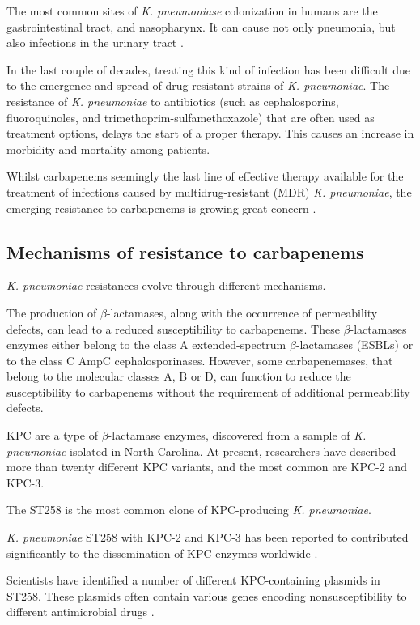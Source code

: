 \documentclass[11pt]{report}
\begin{document}
The most common sites of \emph{K. pneumoniase} colonization in humans are the gastrointestinal tract, and nasopharynx.
It can cause not only pneumonia, but also infections in the urinary tract \cite{Pitout2015, podschun1998klebsiella}.

In the last couple of decades, treating this kind of infection has been difficult due to the emergence and spread of drug-resistant strains of \emph{K. pneumoniae}.
The resistance of \emph{K. pneumoniae} to antibiotics (such as cephalosporins, fluoroquinoles, and trimethoprim-sulfamethoxazole) that are often used as treatment options, delays the start of a proper therapy.
This causes an increase in morbidity and mortality among patients.

Whilst carbapenems seemingly the last line of effective therapy available for the treatment of infections caused by multidrug-resistant (MDR) \emph{K. pneumoniae}, the emerging resistance to carbapenems is growing great concern
 \cite{Pitout2015}.

\subsection{Mechanisms of resistance to carbapenems} 

\emph{K. pneumoniae} resistances evolve through different mechanisms.

The production of $\beta$-lactamases, along with the occurrence of permeability defects, can lead to a reduced susceptibility to carbapenems.
These $\beta$-lactamases enzymes either belong to the class A extended-spectrum $\beta$-lactamases (ESBLs) or to the class C AmpC cephalosporinases.
However, some carbapenemases, that belong to the molecular classes A, B or D, can function to reduce the susceptibility to carbapenems without the requirement of additional permeability defects.

KPC are a type of $\beta$-lactamase enzymes, discovered from a sample of \emph{K. pneumoniae} isolated in North Carolina. At present, researchers have described more than twenty different KPC variants, and the most common are KPC-2 and KPC-3.

The ST258 is the most common clone of KPC-producing \emph{K. pneumoniae}. 

\emph{K. pneumoniae} ST258 with KPC-2 and KPC-3 has been reported to contributed significantly to the dissemination of KPC enzymes worldwide \cite{Pitout2015}.

Scientists have identified a number of different KPC-containing plasmids in ST258. These plasmids often contain various genes encoding nonsusceptibility to different antimicrobial drugs \cite{Pitout2015}.
\end{document}
